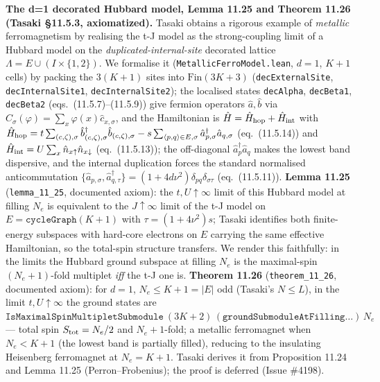 \documentclass[a4paper,11pt]{article}
\begin{document}
\medskip\noindent\textbf{The d=1 decorated Hubbard model, Lemma 11.25 and Theorem 11.26
(Tasaki §11.5.3, axiomatized).}  Tasaki obtains a rigorous example of \emph{metallic}
ferromagnetism by realising the t-J model as the strong-coupling limit of a Hubbard model on
the \emph{duplicated-internal-site} decorated lattice $\Lambda=E\cup(I\times\{1,2\})$.  We
formalise it (\texttt{MetallicFerroModel.lean}, $d=1$, $K+1$ cells) by packing the $3(K+1)$
sites into $\mathrm{Fin}(3K+3)$ (\texttt{decExternalSite}, \texttt{decInternalSite1},
\texttt{decInternalSite2}); the localised states \texttt{decAlpha}, \texttt{decBeta1},
\texttt{decBeta2} (eqs.~(11.5.7)--(11.5.9)) give fermion operators $\hat a,\hat b$ via
$\hat C_\sigma(\varphi)=\sum_x\varphi(x)\hat c_{x,\sigma}$, and the Hamiltonian is
$\hat H=\hat H_{\rm hop}+\hat H_{\rm int}$ with
$\hat H_{\rm hop}=t\sum_{(c,\zeta),\sigma}\hat b^\dagger_{(c,\zeta),\sigma}\hat b_{(c,\zeta),\sigma}
-s\sum_{\langle p,q\rangle\in E,\sigma}\hat a^\dagger_{p,\sigma}\hat a_{q,\sigma}$
(eq.~(11.5.14)) and $\hat H_{\rm int}=U\sum_x\hat n_{x\uparrow}\hat n_{x\downarrow}$
(eq.~(11.5.13)); the off-diagonal $\hat a^\dagger_p\hat a_q$ makes the lowest band dispersive,
and the internal duplication forces the standard normalised anticommutation
$\{\hat a_{p,\sigma},\hat a^\dagger_{q,\tau}\}=(1+4d\nu^2)\delta_{pq}\delta_{\sigma\tau}$
(eq.~(11.5.11)).  \textbf{Lemma 11.25} (\texttt{lemma\_11\_25}, documented axiom): the
$t,U\uparrow\infty$ limit of this Hubbard model at filling $N_e$ is equivalent to the
$J\uparrow\infty$ limit of the t-J model on $E=\texttt{cycleGraph}(K+1)$ with
$\tau=(1+4\nu^2)s$; Tasaki identifies both finite-energy subspaces with hard-core electrons on
$E$ carrying the same effective Hamiltonian, so the total-spin structure transfers.  We render
this faithfully: in the limits the Hubbard ground subspace at filling $N_e$ is the maximal-spin
$(N_e+1)$-fold multiplet \emph{iff} the t-J one is.  \textbf{Theorem 11.26}
(\texttt{theorem\_11\_26}, documented axiom): for $d=1$, $N_e\le K+1=|E|$ odd (Tasaki's
$N\le L$), in the limit $t,U\uparrow\infty$ the ground states are
$\texttt{IsMaximalSpinMultipletSubmodule}~(3K+2)\,(\texttt{groundSubmoduleAtFilling}\dots)\,N_e$
--- total spin $S_{\rm tot}=N_e/2$ and $N_e+1$-fold; a metallic ferromagnet when $N_e<K+1$ (the
lowest band is partially filled), reducing to the insulating Heisenberg ferromagnet at
$N_e=K+1$.  Tasaki derives it from Proposition 11.24 and Lemma 11.25 (Perron--Frobenius); the
proof is deferred (Issue \#4198).
\end{document}
